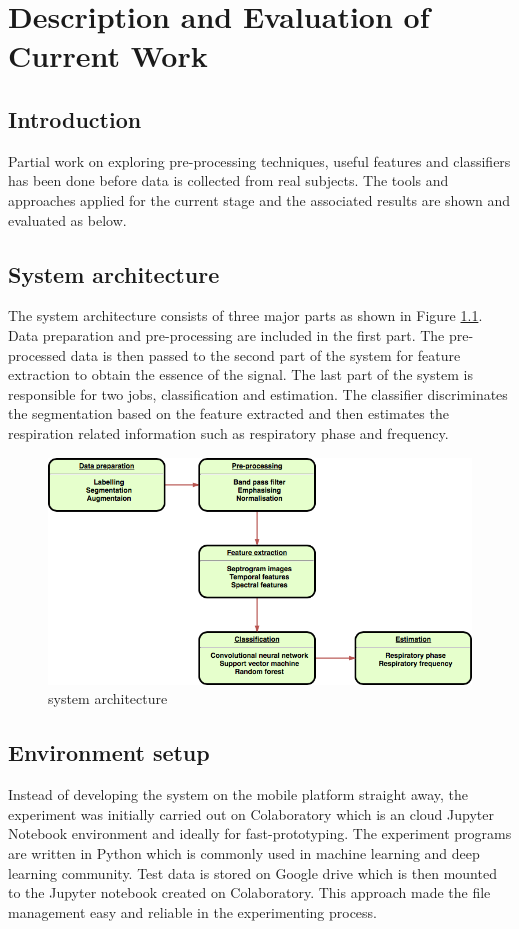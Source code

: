 \chapter{Description and Evaluation of Current Work}
\section{Introduction}
Partial work on exploring pre-processing techniques, useful features and classifiers has been done before data is collected from real subjects. The tools and approaches applied for the current stage and the associated results are shown and evaluated as below.

\section{System architecture}
The system architecture consists of three major parts as shown in Figure \ref{fig:system_architecture}. Data preparation and pre-processing are included in the first part. The pre-processed data is then passed to the second part of the system for feature extraction to obtain the essence of the signal. The last part of the system is responsible for two jobs, classification and estimation. The classifier discriminates the segmentation based on the feature extracted and then estimates the respiration related information such as respiratory phase and frequency. 

\begin{figure}[h]
    \centerline{\includegraphics[scale=0.45]{figures/system_architecture.png}}
    \caption{system architecture}
    \label{fig:system_architecture}
\end{figure}


\section{Environment setup}
Instead of developing the system on the mobile platform straight away, the experiment was initially carried out on Colaboratory which is an cloud Jupyter Notebook environment and ideally for fast-prototyping. The experiment programs are written in Python which is commonly used in machine learning and deep learning community. Test data is stored on Google drive which is then mounted to the Jupyter notebook created on Colaboratory. This approach made the file management easy and reliable in the experimenting process. 

